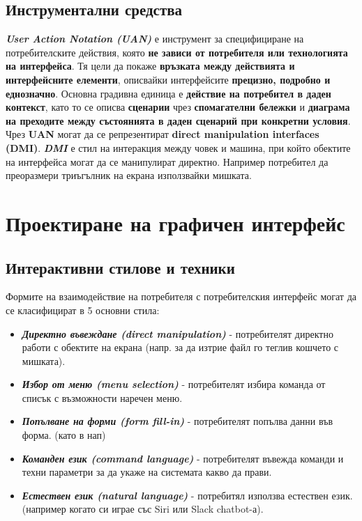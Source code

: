 \documentclass[fleqn,12pt]{article}
\begin{document}
\subsection{Инструментални средства}

\textit{\textbf{User Action Notation (UAN)}} е инструмент за специфициране на потребителските действия, която \textbf{не зависи от потребителя или технологията на интерфейса}.
Тя цели да покаже \textbf{връзката между действията и интерфейсните елементи}, описвайки интерфейсите \textbf{прецизно, подробно и еднозначно}.
\bigbreak
Основна градивна единица е \textbf{действие на потребител в даден контекст}, като то се описва \textbf{сценарии} чрез \textbf{спомагателни бележки} и \textbf{диаграма на преходите между състоянията в даден сценарий при конкретни условия}. 
\bigbreak
Чрез \textbf{UAN} могат да се репрезентират \textbf{direct manipulation interfaces (DMI)}.
\textit{\textbf{DMI}} е стил на интеракция между човек и машина, при който обектите на интерфейса могат да се манипулират директно.
Например потребител да преоразмери триъгълник на екрана използвайки мишката.

\section{Проектиране на графичен интерфейс}

\subsection{Интерактивни стилове и техники}

Формите на взаимодействие на потребителя с потребителския интерфейс могат да се класифицират в 5 основни стила:
\begin{itemize}
    \item \textbf{\textit{Директно въвеждане (direct manipulation)}} - потребителят директно работи с обектите на екрана (напр. за да изтрие файл го теглив кошчето с мишката).
    \item \textbf{\textit{Избор от меню (menu selection)}} - потребителят избира команда от списък с възможности наречен меню.
    \item \textbf{\textit{Попълване на форми (form fill-in)}} - потребителят попълва данни във форма. (като в нап)
    \item \textbf{\textit{Команден език (command language)}} - потребителят въвежда команди и техни параметри за да укаже на системата какво да прави.
    \item \textbf{\textit{Естествен език (natural language)}} - потребитял използва естествен език. (например когато си играе със Siri или Slack chatbot-а).
\end{itemize}
\end{document}
